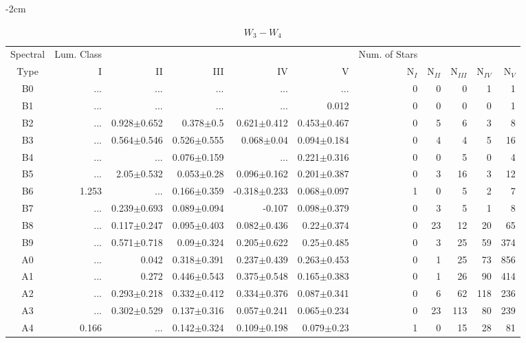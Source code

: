 \begin{table}[t]
\tiny
\centering
\caption{$W_{3}-W_{4}$}
\begin{center}
    \addtolength{\leftskip} {-2cm}
    \addtolength{\rightskip}{-2cm}
    \begin{tabular}{c|rrrrr|rrrrr}
    \toprule
    Spectral & Lum. Class & & & & & Num. of Stars & & & &  \\
    Type & I & II & III &  IV & V & N$_{I}$ & N$_{II}$ & N$_{III}$ & N$_{IV}$ & N$_{V}$ \\ \midrule
  
B0	&	 ...	&	 ...	&	 ...	&	 ...	&	 ...	&	0	&	0	&	0	&	1	&	1	\\
B1	&	 ...	&	 ...	&	 ...	&	 ...	&	0.012	&	0	&	0	&	0	&	0	&	1	\\
B2	&	 ...	&	0.928$\pm$0.652	&	0.378$\pm$0.5	&	0.621$\pm$0.412	&	0.453$\pm$0.467	&	0	&	5	&	6	&	3	&	8	\\
B3	&	 ...	&	0.564$\pm$0.546	&	0.526$\pm$0.555	&	0.068$\pm$0.04	&	0.094$\pm$0.184	&	0	&	4	&	4	&	5	&	16	\\
B4	&	 ...	&	 ...	&	0.076$\pm$0.159	&	 ...	&	0.221$\pm$0.316	&	0	&	0	&	5	&	0	&	4	\\
B5	&	 ...	&	2.05$\pm$0.532	&	0.053$\pm$0.28	&	0.096$\pm$0.162	&	0.201$\pm$0.387	&	0	&	3	&	16	&	3	&	12	\\
B6	&	1.253	&	 ...	&	0.166$\pm$0.359	&	-0.318$\pm$0.233	&	0.068$\pm$0.097	&	1	&	0	&	5	&	2	&	7	\\
B7	&	 ...	&	0.239$\pm$0.693	&	0.089$\pm$0.094	&	-0.107	&	0.098$\pm$0.379	&	0	&	3	&	5	&	1	&	8	\\
B8	&	 ...	&	0.117$\pm$0.247	&	0.095$\pm$0.403	&	0.082$\pm$0.436	&	0.22$\pm$0.374	&	0	&	23	&	12	&	20	&	65	\\
B9	&	 ...	&	0.571$\pm$0.718	&	0.09$\pm$0.324	&	0.205$\pm$0.622	&	0.25$\pm$0.485	&	0	&	3	&	25	&	59	&	374	\\
A0	&	 ...	&	0.042	&	0.318$\pm$0.391	&	0.237$\pm$0.439	&	0.263$\pm$0.453	&	0	&	1	&	25	&	73	&	856	\\
A1	&	 ...	&	0.272	&	0.446$\pm$0.543	&	0.375$\pm$0.548	&	0.165$\pm$0.383	&	0	&	1	&	26	&	90	&	414	\\
A2	&	 ...	&	0.293$\pm$0.218	&	0.332$\pm$0.412	&	0.334$\pm$0.376	&	0.087$\pm$0.341	&	0	&	6	&	62	&	118	&	236	\\
A3	&	 ...	&	0.302$\pm$0.529	&	0.137$\pm$0.316	&	0.057$\pm$0.241	&	0.065$\pm$0.234	&	0	&	23	&	113	&	80	&	239	\\
A4	&	0.166	&	 ...	&	0.142$\pm$0.324	&	0.109$\pm$0.198	&	0.079$\pm$0.23	&	1	&	0	&	15	&	28	&	81	\\

\end{tabular}
\end{center}
\end{table}
